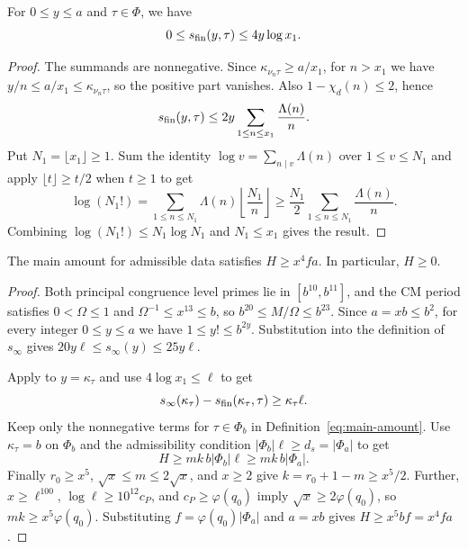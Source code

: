 \begin{lemma}
\label{lem:main-prime-bound}
\emitthmsource
For $0\le y\le a$ and $\tau\in\Phi$, we have
\[
 0\le s_{\rm fin}(y,\tau)\le 4y\log x_1 .
\]
\end{lemma}
\begin{proof}
The summands are nonnegative. Since $\kappa_{\nu_n\tau}\ge a/x_1$, for $n>x_1$ we have
$y/n\le a/x_1\le\kappa_{\nu_n\tau}$, so the positive part vanishes. Also $1-\chi_d(n)\le2$, hence
\[
 s_{\rm fin}(y,\tau)\le 2y\sum_{1\le n\le x_1}\frac{\Lambda(n)}{n}.
\]
Put $N_1=\lfloor x_1\rfloor\ge1$. Sum the identity $\log v=\sum_{n\mid v}\Lambda(n)$ over $1\le v\le N_1$ and apply $\lfloor t\rfloor\ge t/2$ when $t\ge1$ to get
\[
 \log(N_1!)=\sum_{1\le n\le N_1}\Lambda(n)\left\lfloor\frac{N_1}{n}\right\rfloor
 \ge\frac{N_1}{2}\sum_{1\le n\le N_1}\frac{\Lambda(n)}{n}.
\]
Combining $\log(N_1!)\le N_1\log N_1$ and $N_1\le x_1$ gives the result.
\end{proof}

\begin{lemma}
\label{lem:main-amount-lower}
\emitthmsource
The main amount for admissible data satisfies $H\ge x^4fa$. In particular, $H\ge0$.
\end{lemma}
\begin{proof}
Both principal congruence level primes lie in $[b^{10},b^{11}]$, and the CM period satisfies $0<\Omega\le1$ and
$\Omega^{-1}\le x^{13}\le b$, so $b^{20}\le M/\Omega\le b^{23}$.
Since $a=xb\le b^2$, for every integer $0\le y\le a$ we have $1\le y!\le b^{2y}$.
Substitution into the definition of $s_\infty$ gives $20y\ell\le s_\infty(y)\le25y\ell$.

Apply  to $y=\kappa_\tau$ and use $4\log x_1\le\ell$ to get
\[
 s_\infty(\kappa_\tau)-s_{\rm fin}(\kappa_\tau,\tau)\ge\kappa_\tau\ell .
\]
Keep only the nonnegative terms for $\tau\in\Phi_b$ in Definition~\eqref{eq:main-amount}. Use $\kappa_\tau=b$ on $\Phi_b$ and the admissibility condition $|\Phi_b|\ell\ge d_s=|\Phi_a|$ to get
\[
 H\ge mk\, b|\Phi_b|\ell\ge mk\, b|\Phi_a|.
\]
Finally $r_0\ge x^5$, $\sqrt x\le m\le2\sqrt x$, and $x\ge2$ give
$k=r_0+1-m\ge x^5/2$.
Further, $x\ge\ell^{100}$, $\log\ell\ge10^{12}c_P$, and $c_P\ge\varphi(q_0)$ imply $\sqrt x\ge 2\varphi(q_0)$,
so $mk\ge x^5\varphi(q_0)$. Substituting $f=\varphi(q_0)|\Phi_a|$ and $a=xb$
gives $H\ge x^5 b f=x^4fa$.
\end{proof}

